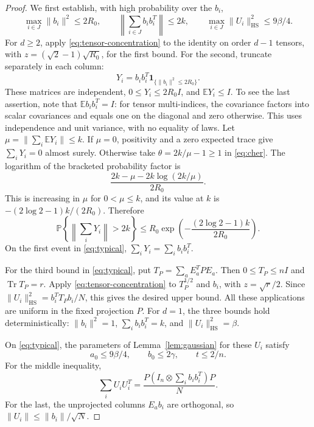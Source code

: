 \documentclass[11pt]{article}
\newcommand{\E}{\mathbb E}
\newcommand{\Prob}{\mathbb P}
\newcommand{\HS}{\mathrm{HS}}
\newcommand{\Tr}{\operatorname{Tr}}
\newcommand{\ind}{\mathbf 1}
\begin{document}
\begin{proof}
We first establish, with high probability over the \(b_i\),
\begin{equation}\label{eq:typical}
 \max_{i\in J}\|b_i\|^2\le2R_0,\qquad
 \left\|\sum_{i\in J}b_ib_i^T\right\|\le2k,\qquad
 \max_{i\in J}\|U_i\|_{\HS}^2\le9\beta/4.
\end{equation}
For \(d\ge2\), apply \eqref{eq:tensor-concentration} to the
identity on order \(d-1\) tensors, with
\(z=(\sqrt2-1)\sqrt{R_0}\), for the first bound.
For the second, truncate separately in each column:
\[
 Y_i=b_ib_i^T\ind_{\{\|b_i\|^2\le2R_0\}}.
\]
These matrices are independent, \(0\le Y_i\le2R_0I\), and
\(\E Y_i\le I\).
To see the last assertion, note that \(\E b_ib_i^T=I\):
for tensor multi-indices, the covariance factors into scalar
covariances and equals one on the diagonal and zero otherwise.
This uses independence and unit variance, with no equality of laws.
Let \(\mu=\|\sum_i\E Y_i\|\le k\).
If \(\mu=0\), positivity and a zero expected trace give
\(\sum_iY_i=0\) almost surely.
Otherwise take \(\theta=2k/\mu-1\ge1\) in \eqref{eq:cher}.
The logarithm of the bracketed probability factor is
\[
 \frac{2k-\mu-2k\log(2k/\mu)}{2R_0}.
\]
This is increasing in \(\mu\) for \(0<\mu\le k\), and its value
at \(k\) is \(-(2\log2-1)k/(2R_0)\). Therefore
\begin{equation}\label{eq:covariance-tail}
 \Prob\!\left\{\left\|\sum_iY_i\right\|>2k\right\}
 \le R_0\exp\!\left(-\frac{(2\log2-1)k}{2R_0}\right).
\end{equation}
On the first event in \eqref{eq:typical}, \(\sum_iY_i=\sum_ib_ib_i^T\).

For the third bound in \eqref{eq:typical}, put
\(T_P=\sum_aE_a^TPE_a\). Then \(0\le T_P\le nI\) and
\(\Tr T_P=r\). Apply \eqref{eq:tensor-concentration} to
\(T_P^{1/2}\) and \(b_i\), with \(z=\sqrt r/2\).
Since
\(\|U_i\|_{\HS}^2=b_i^TT_Pb_i/N\), this gives the desired
upper bound. All these applications are uniform in the fixed
projection \(P\).
For \(d=1\), the three bounds hold deterministically:
\(\|b_i\|^2=1\), \(\sum_ib_ib_i^T=k\), and
\(\|U_i\|_{\HS}^2=\beta\).

On \eqref{eq:typical}, the parameters of Lemma~\ref{lem:gaussian}
for these \(U_i\) satisfy
\begin{equation}\label{eq:parameters}
 a_0\le9\beta/4,\qquad b_0\le2\gamma,\qquad t\le2/n.
\end{equation}
For the middle inequality,
\[
 \sum_iU_iU_i^T
 =\frac{P(I_n\otimes\sum_ib_ib_i^T)P}{N}.
\]
For the last, the unprojected columns \(E_ab_i\) are orthogonal,
so \(\|U_i\|\le\|b_i\|/\sqrt N\).


\end{proof}
\end{document}
